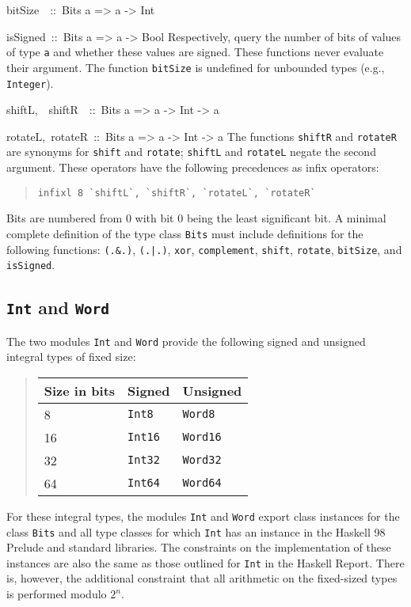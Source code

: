 \documentclass[a4paper,twoside]{article}
\makeatletter
\newcommand{\code}[1]{\texttt{#1}}      %
\newenvironment{codedesc}{%
  \list{}{\labelwidth\z@
    \let\makelabel\codedesclabel}
  }{%
  \endlist
  }
\newcommand*{\codedesclabel}[1]{%
  \hspace{-\leftmargin}
  \parbox[b]{\labelwidth}{\makebox[0pt][l]{\code{#1}}\\}\hfil\relax
  }
\newcommand{\combineitems}{\vspace*{-\itemsep}\vspace*{-\parsep}\vspace*{-1em}}
\makeatother
\begin{document}
\begin{codedesc}
\item[bitSize~~::\ Bits a => a -> Int]
\item[isSigned~::\ Bits a => a -> Bool]\combineitems Respectively, query the
  number of bits of values of type \code{a} and whether these values are
  signed.  These functions never evaluate their argument.  The function
  \code{bitSize} is undefined for unbounded types (e.g., \code{Integer}).

\item[shiftL,~~shiftR~~::\ Bits a => a -> Int -> a]
\item[rotateL,~rotateR~::\ Bits a => a -> Int -> a]\combineitems The functions
  \code{shiftR} and \code{rotateR} are synonyms for \code{shift} and
  \code{rotate}; \code{shiftL} and \code{rotateL} negate the second argument.
  These operators have the following precedences as infix operators:
  \begin{quote}
\begin{verbatim}
infixl 8 `shiftL`, `shiftR`, `rotateL`, `rotateR`
\end{verbatim}
  \end{quote}

\end{codedesc}
%
Bits are numbered from 0 with bit 0 being the least significant bit.  A
minimal complete definition of the type class \code{Bits} must include
definitions for the following functions: \code{(.\&.)}, \code{(.|.)},
\code{xor}, \code{complement}, \code{shift}, \code{rotate}, \code{bitSize},
and \code{isSigned}. 

\subsection{\code{Int} and \code{Word}}
\label{sec:Int-Word}

The two modules \code{Int} and \code{Word} provide the following signed and
unsigned integral types of fixed size:
%
\begin{quote}
  \begin{tabular}{|l|l|l|}
    \hline
    Size in bits & Signed       & Unsigned\\\hline\hline
    8            & \code{Int8}  & \code{Word8}\\
    16           & \code{Int16} & \code{Word16}\\
    32           & \code{Int32} & \code{Word32}\\
    64           & \code{Int64} & \code{Word64}\\
    \hline
  \end{tabular}
\end{quote}
%
For these integral types, the modules \code{Int} and \code{Word} export class
instances for the class \code{Bits} and all type classes for which \code{Int}
has an instance in the Haskell 98 Prelude and standard libraries.  The
constraints on the implementation of these instances are also the same as
those outlined for \code{Int} in the Haskell Report.  There is, however, the
additional constraint that all arithmetic on the fixed-sized types is
performed modulo \(2^n\).
\end{document}
